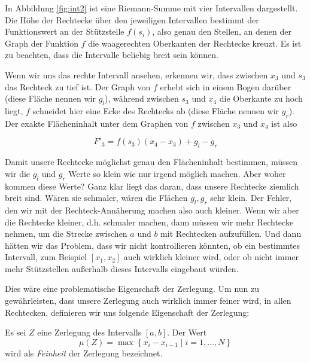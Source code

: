 In Abbildung \ref{fig:int2} ist eine Riemann-Summe mit vier Intervallen dargestellt. Die Höhe der Rechtecke über den jeweiligen Intervallen bestimmt der Funktionswert an der Stützstelle $f(s_i)$, also genau den Stellen, an denen der Graph der Funktion $f$ die waagerechten Oberkanten der Rechtecke kreuzt. Es ist zu beachten, dass die Intervalle beliebig breit sein können.

Wenn wir uns das rechte Intervall ansehen, erkennen wir, dass zwischen $x_3$ und $s_3$ das Rechteck zu tief ist. Der Graph von $f$ erhebt sich in einem Bogen darüber (diese Fläche nennen wir $g_l$), während zwischen $s_3$ und $x_4$ die Oberkante zu hoch liegt, $f$ schneidet hier eine Ecke des Rechtecks ab (diese Fläche nennen wir $g_r$). Der exakte Flächeninhalt unter dem Graphen von $f$ zwischen $x_3$ und $x_4$ ist also

\begin{equation}
F'_3 = f(s_3)(x_4-x_3)+g_l-g_r
\end{equation}

Damit unsere Rechtecke möglichst genau den Flächeninhalt bestimmen, müssen wir die $g_l$ und $g_r$ Werte so klein wie nur irgend möglich machen. Aber woher kommen diese Werte? Ganz klar liegt das daran, dass unsere Rechtecke ziemlich breit sind. Wären sie schmaler, wären die Flächen $g_l,g_r$ sehr klein. Der Fehler, den wir mit der Rechteck-Annäherung machen also auch kleiner. Wenn wir aber die Rechtecke kleiner, d.h. schmaler machen, dann müssen wir mehr Rechtecke nehmen, um die Strecke zwischen $a$ und $b$ mit Rechtecken aufzufüllen. Und dann hätten wir das Problem, dass wir nicht kontrollieren könnten, ob ein bestimmtes Intervall, zum Beispiel $[x_1,x_2]$ auch wirklich kleiner wird, oder ob nicht immer mehr Stützstellen außerhalb dieses Intervalls eingebaut würden. 

Dies wäre eine problematische Eigenschaft der Zerlegung. Um nun zu gewährleisten, dass unsere Zerlegung auch wirklich immer feiner wird, in allen Rechtecken, definieren wir uns folgende Eigenschaft der Zerlegung:

\begin{definition}
Es sei $Z$ eine Zerlegung des Intervalls $[a,b]$. Der Wert
\begin{equation}
\mu (Z) = \max\left\{ x_{i}-x_{i-1} \middle| i=1,\dots ,N  \right\}
\end{equation}
wird als \emph{Feinheit} der Zerlegung bezeichnet.
\end{definition}

